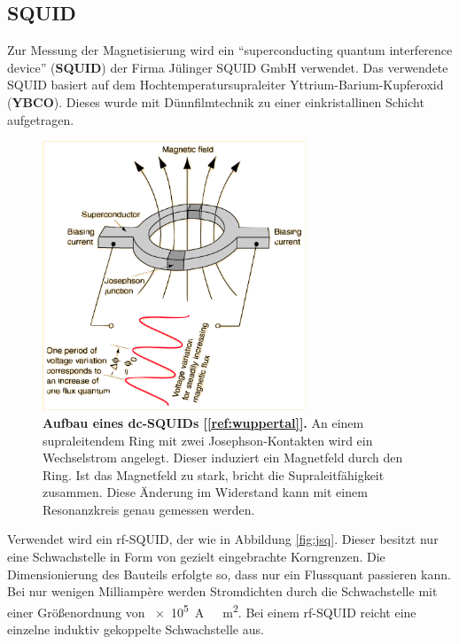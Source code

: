 \documentclass[a4paper,ngerman]{scrartcl}
\begin{document}
\subsection{SQUID}

Zur Messung der Magnetisierung wird ein "`superconducting quantum interference device"' (\textbf{SQUID}) der Firma Jülinger SQUID GmbH verwendet. 
Das verwendete SQUID basiert auf dem Hochtemperatursupraleiter Yttrium-Barium-Kupferoxid (\textbf{YBCO}).
Dieses wurde mit Dünnfilmtechnik zu einer einkristallinen Schicht aufgetragen.


\begin{figure}[tb!]
\centering
\includegraphics[width=0.7\textwidth]{abbildungen/squide.png}
\caption[Versuchsplatz]{\textbf{Aufbau eines dc-SQUIDs [\ref{ref:wuppertal}].} An einem supraleitendem Ring mit zwei Josephson-Kontakten wird ein Wechselstrom angelegt. 
Dieser induziert ein Magnetfeld durch den Ring. 
Ist das Magnetfeld zu stark, bricht die Supraleitfähigkeit zusammen.
Diese Änderung im Widerstand kann mit einem Resonanzkreis genau gemessen werden.}
\label{fig:squid_wuppertal}
\end{figure}

Verwendet wird ein rf-SQUID, der wie in Abbildung \ref{fig:jsq}. 
Dieser besitzt nur eine Schwachstelle in Form von gezielt eingebrachte Korngrenzen.
Die Dimensionierung des Bauteils erfolgte so, dass nur ein Flussquant passieren kann.
Bei nur wenigen Milliampère werden Stromdichten durch die Schwachstelle mit einer Größenordnung von \SI{e5}{A \per  \centi \square \meter}.
Bei einem rf-SQUID reicht eine einzelne induktiv gekoppelte Schwachstelle aus.
\end{document}
